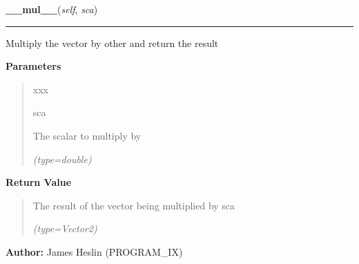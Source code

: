 \hspace{.8\funcindent}\begin{boxedminipage}{\funcwidth}

    \raggedright \textbf{\_\_mul\_\_}(\textit{self}, \textit{sca})

    \vspace{-1.5ex}

    \rule{\textwidth}{0.5\fboxrule}
\setlength{\parskip}{2ex}
    Multiply the vector by other and return the result

\setlength{\parskip}{1ex}
      \textbf{Parameters}
      \vspace{-1ex}

      \begin{quote}
        \begin{Ventry}{xxx}

          \item[sca]

          The scalar to multiply by

            {\it (type=double)}

        \end{Ventry}

      \end{quote}

      \textbf{Return Value}
    \vspace{-1ex}

      \begin{quote}
      The result of the vector being multiplied by sca

      {\it (type=Vector2)}

      \end{quote}

\textbf{Author:} James Heslin (PROGRAM\_IX)



    \end{boxedminipage}

    \label{pystroke:vector2:Vector2:__div__}

    \vspace{0.5ex}

